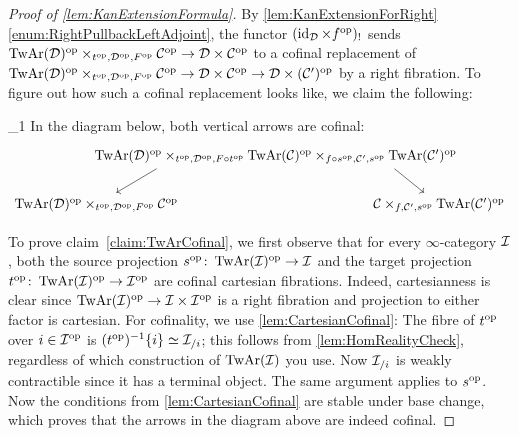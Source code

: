 \begin{proof}[Proof of \cref{lem:KanExtensionFormula}]
	By  \cref{lem:KanExtensionForRight}\cref{enum:RightPullbackLeftAdjoint}, the functor $(\operatorname{id}_{\mathcal{D}}\times f^{\mathrm{op}})_!$ sends $\operatorname{TwAr}(\mathcal{D})^{\mathrm{op}}\times_{t^{\mathrm{op}},\mathcal{D}^{\mathrm{op}},F^{\mathrm{op}}}\mathcal{C}^{\mathrm{op}}\rightarrow \mathcal{D}\times\mathcal{C}^{\mathrm{op}}$ to a cofinal replacement of $\operatorname{TwAr}(\mathcal{D})^{\mathrm{op}}\times_{t^{\mathrm{op}},\mathcal{D}^{\mathrm{op}},F^{\mathrm{op}}}\mathcal{C}^{\mathrm{op}}\rightarrow \mathcal{D}\times\mathcal{C}^{\mathrm{op}}\rightarrow \mathcal{D}\times(\mathcal{C}')^{\mathrm{op}}$ by a right fibration. To figure out how such a cofinal replacement looks like, we claim the following:
	\begin{alphanumerate}\itshape
		\item[\boxtimes_1] In the diagram below, both vertical arrows are cofinal:\label{claim:TwArCofinal}
		\begin{equation*}
			\begin{tikzcd}[column sep=-7em]
				& \TwAr(\Dd)^\op\times_{t^\op,\Dd^\op,F\circ t^\op}\TwAr(\Cc)^\op\times_{f\circ s^\op,\Cc',s^\op}\TwAr(\Cc')^\op\dlar[start anchor=186]\drar[start anchor=-6]& \\
				\TwAr(\Dd)^\op\times_{t^\op,\Dd^\op,F^\op}\Cc^\op & & \Cc\times_{f,\Cc',s^\op}\TwAr(\Cc')^\op
			\end{tikzcd}
		\end{equation*} 
	\end{alphanumerate}
	To prove claim~\cref{claim:TwArCofinal}, we first observe that for every $\infty$-category $\mathcal{I}$, both the source projection $s^{\mathrm{op}}\colon \operatorname{TwAr}(\mathcal{I})^{\mathrm{op}}\rightarrow \mathcal{I}$ and the target projection $t^{\mathrm{op}}\colon \operatorname{TwAr}(\mathcal{I})^{\mathrm{op}}\rightarrow \mathcal{I}^{\mathrm{op}}$ are cofinal cartesian fibrations. Indeed, cartesianness is clear since $\operatorname{TwAr}(\mathcal{I})^{\mathrm{op}}\rightarrow\mathcal{I}\times\mathcal{I}^{\mathrm{op}}$ is a right fibration and projection to either factor is cartesian. For cofinality, we use \cref{lem:CartesianCofinal}: The fibre of $t^{\mathrm{op}}$ over $i\in \mathcal{I}^{\mathrm{op}}$ is $(t^{\mathrm{op}})^{-1}\{i\}\simeq \mathcal{I}_{/i}$; this follows from \cref{lem:HomRealityCheck}, regardless of which construction of $\operatorname{TwAr}(\mathcal{I})$ you use. Now $\mathcal{I}_{/i}$ is weakly contractible since it has a terminal object. The same argument applies to $s^{\mathrm{op}}$. Now the conditions from \cref{lem:CartesianCofinal} are stable under base change, which proves that the arrows in the diagram above are indeed cofinal.
	

\end{proof}
